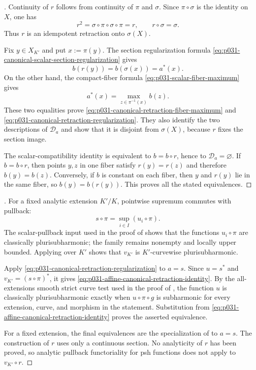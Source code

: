 
\begin{proof}[]
Continuity of $r$ follows from continuity of $\pi$ and $\sigma$.  Since
$\pi\circ\sigma$ is the identity on $X$, one has
\[
 r^2=\sigma\circ\pi\circ\sigma\circ\pi=r,
 \qquad
 r\circ\sigma=\sigma.
\]
Thus $r$ is an idempotent retraction onto $\sigma(X)$.

Fix $y\in X_{K'}$ and put $x:=\pi(y)$.  The section regularization formula
\eqref{eq:p031-canonical-scalar-section-regularization} gives
\[
                     b(r(y))=b(\sigma(x))=a^*(x).
\]
On the other hand, the compact-fiber formula
\eqref{eq:p031-scalar-fiber-maximum} gives
\[
                  a^*(x)=\max_{z\in\pi^{-1}(x)}b(z).
\]
These two equalities prove
\eqref{eq:p031-canonical-retraction-fiber-maximum} and
\eqref{eq:p031-canonical-retraction-regularization}.  They also identify
the two descriptions of $\mathcal D_a$ and show that it is disjoint from
$\sigma(X)$, because $r$ fixes the section image.

The scalar-compatibility identity is equivalent to $b=b\circ r$, hence to
$\mathcal D_a=\varnothing$.  If $b=b\circ r$, then points $y,z$ in one
fiber satisfy $r(y)=r(z)$ and therefore $b(y)=b(z)$.  Conversely, if $b$
is constant on each fiber, then $y$ and $r(y)$ lie in the same fiber, so
$b(y)=b(r(y))$.  This proves all the stated equivalences.
\end{proof}

\begin{proof}[]
For a fixed analytic extension $K'/K$, pointwise supremum commutes with
pullback:
\[
                    s\circ\pi=\sup_{i\in I}(u_i\circ\pi).
\]
The scalar-pullback input used in the proof of
 shows that the functions
$u_i\circ\pi$ are classically plurisubharmonic; the family remains nonempty
and locally upper bounded.  Applying
 over $K'$ shows that
$v_{K'}$ is $K'$-curvewise plurisubharmonic.

Apply
\eqref{eq:p031-canonical-retraction-regularization} to $a=s$.  Since
$u=s^*$ and $v_{K'}=(s\circ\pi)^*$, it gives
\eqref{eq:p031-affine-canonical-retraction-identity}.  By the all-extensions
smooth strict curve test used in the proof of
, the function $u$ is classically
plurisubharmonic exactly when
$u\circ\pi\circ g$ is subharmonic for every extension, curve, and morphism
in the statement.  Substitution from
\eqref{eq:p031-affine-canonical-retraction-identity} proves the asserted
equivalence.

For a fixed extension, the final equivalences are the specialization of
 to $a=s$.  The
construction of $r$ uses only a continuous section.  No analyticity of $r$
has been proved, so analytic pullback functoriality for psh functions does
not apply to $v_{K'}\circ r$.
\end{proof}
